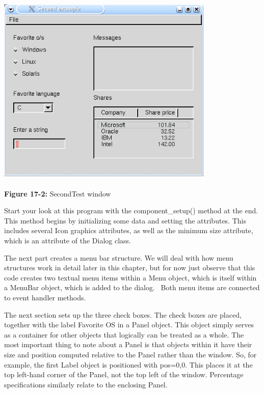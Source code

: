\bigskip

\begin{center}
\includegraphics[width=4.0756in,height=3.6465in]{ub-img/ub-img51.jpg}
\end{center}

{\sffamily\bfseries Figure 17-2:}
{\sffamily SecondTest window}

\bigskip

Start your look at this program with the \textsf{component\_setup()}
method at the end. This method begins by initializing some data and
setting the attributes. This includes several Icon graphics attributes,
as well as the minimum size attribute, which is an attribute of the
\textsf{Dialog} class.

The next part creates a menu bar structure. We will deal
with how menu structures work in detail later in this chapter, but for
now just observe that this code creates two textual menu items within a
\textsf{Menu} object, which is itself within a \textsf{MenuBar} object,
which is added to the dialog. \ Both menu items are connected to event
handler methods.

The next section sets up the three check boxes. The
check boxes are placed, together with the label {\textquotedbl}Favorite
OS{\textquotedbl} in a \textsf{Panel} object. This object simply
serves as a container for other objects that logically can be treated
as a whole. The most important thing to note about a \textsf{Panel} is
that objects within it have their size and position computed relative
to the \textsf{Panel} rather than the window. So, for example, the
first \textsf{Label} object is positioned with
\textsf{{\textquotedbl}pos=0,0{\textquotedbl}}. This places it at the
top left-hand corner of the \textsf{Panel}, not the top left of the
window. Percentage specifications similarly relate to the enclosing
\textsf{Panel}.

